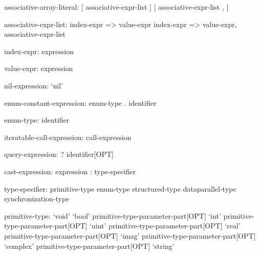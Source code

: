 \begin{syntax}
associative-array-literal:
  [ associative-expr-list ]
  [ associative-expr-list , ]
\end{syntax}

\begin{syntax}
associative-expr-list:
  index-expr => value-expr
  index-expr => value-expr, associative-expr-list
\end{syntax}

\begin{syntax}
index-expr:
  expression
\end{syntax}

\begin{syntax}
value-expr:
  expression
\end{syntax}

\begin{syntax}
nil-expression:
  `nil'
\end{syntax}

\begin{syntax}
enum-constant-expression:
  enum-type . identifier
\end{syntax}

\begin{syntax}
enum-type:
  identifier
\end{syntax}

\begin{syntax}
iteratable-call-expression:
  call-expression
\end{syntax}

\begin{syntax}
query-expression:
  ? identifier[OPT]
\end{syntax}

\begin{syntax}
cast-expression:
  expression : type-specifier
\end{syntax}

\begin{syntax}
type-specifier:
  primitive-type
  enum-type
  structured-type
  dataparallel-type
  synchronization-type
\end{syntax}

\begin{syntax}
primitive-type:
  `void'
  `bool' primitive-type-parameter-part[OPT]
  `int' primitive-type-parameter-part[OPT]
  `uint' primitive-type-parameter-part[OPT]
  `real' primitive-type-parameter-part[OPT]
  `imag' primitive-type-parameter-part[OPT]
  `complex' primitive-type-parameter-part[OPT]
  `string'
\end{syntax}

